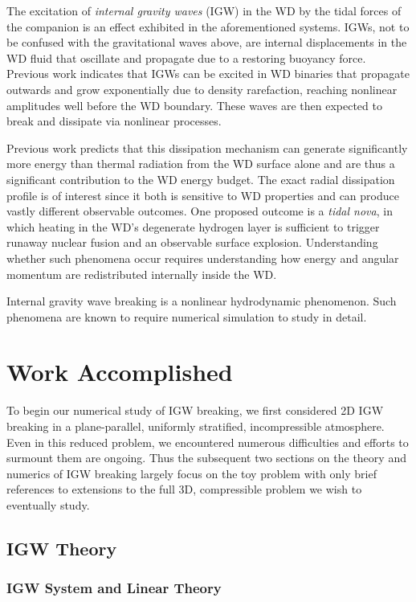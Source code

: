 \documentclass[11pt,
        usenames, %
        dvipsnames %
    ]{article}
\begin{document}
The excitation of \emph{internal gravity waves} (IGW) in the WD by the tidal
forces of the companion is an effect exhibited in the aforementioned systems.
IGWs, not to be confused with the gravitational waves above, are internal
displacements in the WD fluid that oscillate and propagate due to a restoring
buoyancy force. Previous work\citep{fullerI} indicates that IGWs can be excited
in WD binaries that propagate outwards and grow exponentially due to density
rarefaction, reaching nonlinear amplitudes well before the WD boundary. These
waves are then expected to break and dissipate via nonlinear processes.

Previous work predicts that this dissipation mechanism can generate
significantly more energy than thermal radiation from the WD surface alone and
are thus a significant contribution to the WD energy budget\cite{fullerII}. The
exact radial dissipation profile is of interest since it both is sensitive to WD
properties and can produce vastly different observable outcomes. One proposed
outcome is a \emph{tidal nova}, in which heating in the WD's degenerate hydrogen
layer is sufficient to trigger runaway nuclear fusion and an observable surface
explosion\cite{tidal_novae}. Understanding whether such phenomena occur requires
understanding how energy and angular momentum are redistributed internally
inside the WD\@.

Internal gravity wave breaking is a nonlinear hydrodynamic phenomenon. Such
phenomena are known to require numerical simulation to study in detail.

\section{Work Accomplished}

To begin our numerical study of IGW breaking, we first considered 2D IGW
breaking in a plane-parallel, uniformly stratified, incompressible atmosphere.
Even in this reduced problem, we encountered numerous difficulties and efforts
to surmount them are ongoing. Thus the subsequent two sections on the theory and
numerics of IGW breaking largely focus on the toy problem with only brief
references to extensions to the full 3D, compressible problem we wish to
eventually study.

\subsection{IGW Theory}

\subsubsection{IGW System and Linear Theory}
\end{document}
